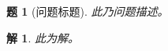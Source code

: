\documentclass[UTF8,10pt,a4paper]{article}
\theoremstyle{Problem}%
\newtheorem{prob}{题}%
\theoremstyle{Solution}%
\newtheorem*{sol}{解}%
\begin{document}
\thispagestyle{FirstPageStyle}%
\begin{prob}[问题标题]
    此乃问题描述。
\end{prob}
\begin{sol}
    此为解。
\end{sol}
\end{document}
